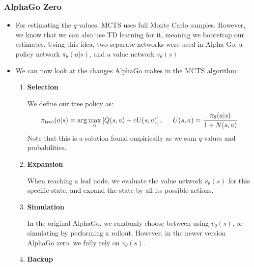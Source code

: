 \subsubsection{AlphaGo Zero}
\begin{itemize}
	\item For estimating the $q$-values, MCTS uses full Monte Carlo samples. However, we know that we can also use TD learning for it, meaning we bootstrap our estimates. Using this idea, two separate networks were used in Alpha Go: a policy network $\pi_{\theta}(a|s)$, and a value network $v_{\theta}(s)$
	\item We can now look at the changes AlphaGo makes in the MCTS algorithm:
	\begin{enumerate}
		\item \textbf{Selection}
		
		We define our tree policy as:
		$$\pi_{\text{tree}}(a|s)=\arg\max_a \left[Q(s,a)+cU(s,a)\right], \hspace{5mm}U(s,a)=\frac{\pi_{\theta}(a|s)}{1+N(s,a)}$$
		Note that this is a solution found empirically as we sum $q$-values and probabilities.
		
		\item \textbf{Expansion}
		
		When reaching a leaf node, we evaluate the value network $v_{\theta}(s)$ for this specific state, and expand the state by all its possible actions.
		
		\item \textbf{Simulation}
		
		In the original AlphaGo, we randomly choose between using $v_{\theta}(s)$, or simulating by performing a rollout. However, in the newer version AlphaGo zero, we fully rely on $v_{\theta}(s)$.
		
		\item \textbf{Backup}
		

\end{enumerate}
\end{itemize}
